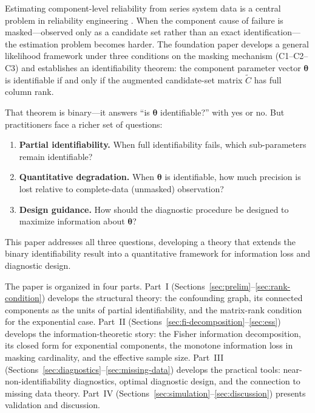 \documentclass[11pt]{article}
\theoremstyle{definition}
\theoremstyle{plain}
\renewcommand{\v}[1]{\boldsymbol{#1}}
\newcommand{\btheta}{\v{\theta}}
\newcommand{\Ctilde}{\tilde{C}}
\begin{document}
Estimating component-level reliability from series system data is a
central problem in reliability engineering
\citep{barlow1975,agustin2011}.
When the component cause of failure is masked---observed only as a
candidate set rather than an exact identification---the estimation
problem becomes harder.
The foundation paper \citep{towell2025masked} develops a general
likelihood framework under three conditions on the masking mechanism
(C1--C2--C3) and establishes an identifiability theorem: the component
parameter vector $\btheta$ is identifiable if and only if the augmented
candidate-set matrix $\Ctilde$ has full column rank.

That theorem is binary---it answers ``is $\btheta$ identifiable?'' with
yes or no.
But practitioners face a richer set of questions:
\begin{enumerate}[label=(\roman*)]
    \item \textbf{Partial identifiability.}
    When full identifiability fails, which sub-parameters remain
    identifiable?
    \item \textbf{Quantitative degradation.}
    When $\btheta$ is identifiable, how much precision is lost
    relative to complete-data (unmasked) observation?
    \item \textbf{Design guidance.}
    How should the diagnostic procedure be designed to maximize
    information about $\btheta$?
\end{enumerate}
This paper addresses all three questions, developing a theory that
extends the binary identifiability result into a quantitative framework
for information loss and diagnostic design.

The paper is organized in four parts.
Part~I (Sections~\ref{sec:prelim}--\ref{sec:rank-condition}) develops
the structural theory: the confounding graph, its connected components
as the units of partial identifiability, and the matrix-rank condition
for the exponential case.
Part~II (Sections~\ref{sec:fi-decomposition}--\ref{sec:ess}) develops
the information-theoretic story: the Fisher information decomposition,
its closed form for exponential components, the monotone information
loss in masking cardinality, and the effective sample size.
Part~III (Sections~\ref{sec:diagnostics}--\ref{sec:missing-data})
develops the practical tools: near-non-identifiability diagnostics,
optimal diagnostic design, and the connection to missing data theory.
Part~IV (Sections~\ref{sec:simulation}--\ref{sec:discussion}) presents
validation and discussion.
\end{document}
